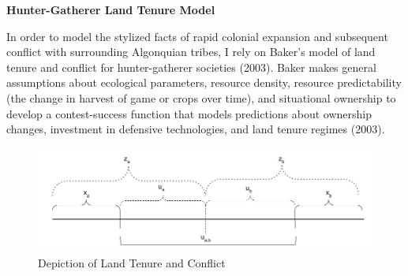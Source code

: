 \documentclass[11pt, oneside]{article}
\begin{document}

\noindent\textbf{Hunter-Gatherer Land Tenure Model}

In order to model the stylized facts of rapid colonial expansion and subsequent conflict with surrounding Algonquian tribes, I rely on Baker's model of land tenure and conflict for hunter-gatherer societies (2003). Baker makes general assumptions about ecological parameters, resource density, resource predictability (the change in harvest of game or crops over time), and situational ownership to develop a contest-success function that models predictions about ownership changes, investment in defensive technologies, and land tenure regimes (2003). 


\begin{figure}
\caption{Depiction of Land Tenure and Conflict}
  \includegraphics[scale=.5]{LandConflict.jpg} 
\end{figure}
\end{document}
